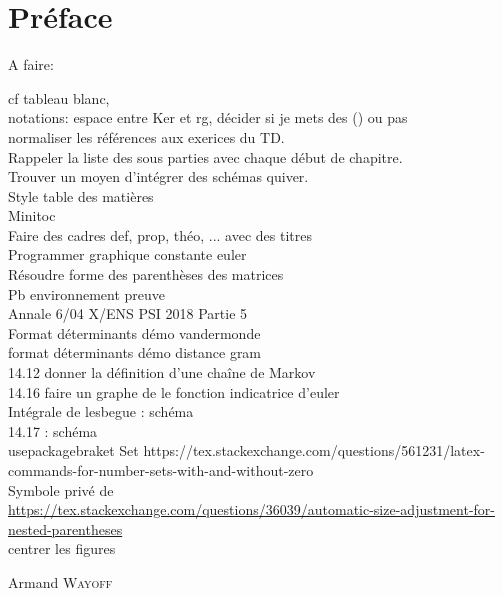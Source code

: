 \pageblanche

\chapter*{Préface}


A faire:

cf tableau blanc, \\
notations: espace entre Ker et rg, décider si je mets des () ou pas \\
normaliser les références aux exerices du TD. \\
Rappeler la liste des sous parties avec chaque début de chapitre. \\
Trouver un moyen d'intégrer des schémas quiver.\\
Style table des matières \\
Minitoc\\
Faire des cadres def, prop, théo, ... avec des titres \\
Programmer graphique constante euler \\
Résoudre forme des parenthèses des matrices \\
Pb environnement preuve \\
Annale 6/04 X/ENS PSI 2018 Partie 5 \\
Format déterminants démo vandermonde \\
format déterminants démo distance gram \\
14.12 donner la définition d'une chaîne de Markov \\
14.16 faire un graphe de le fonction indicatrice d'euler \\
Intégrale de lesbegue : schéma \\
14.17 : schéma \\
usepackage{braket} Set https://tex.stackexchange.com/questions/561231/latex-commands-for-number-sets-with-and-without-zero \\
Symbole privé de \\
\url{https://tex.stackexchange.com/questions/36039/automatic-size-adjustment-for-nested-parentheses} \\
centrer les figures

\begin{flushright}
	Armand \textsc{Wayoff}
\end{flushright}
